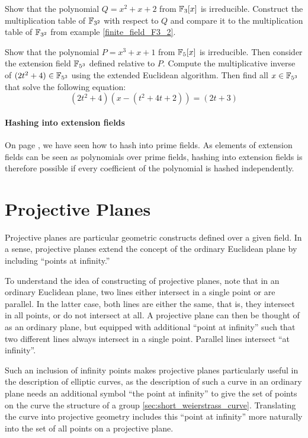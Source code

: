 \begin{exercise} Show that the polynomial $Q=x^2+x+2$ from $\mathbb{F}_3[x]$ is irreducible. Construct the multiplication table of $\mathbb{F}_{3^2}$ with respect to $Q$ and compare it to the multiplication table of $\mathbb{F}_{3^2}$ from example \ref{finite_field_F3_2}.
\end{exercise}

\begin{exercise} Show that the polynomial $P=x^3+x+1$ from $\mathbb{F}_5[x]$ is irreducible. Then consider the extension field $\mathbb{F}_{5^3}$ defined relative to $P$. Compute the multiplicative inverse of $(2t^2+4)\in\mathbb{F}_{5^3}$ using the extended Euclidean algorithm. Then find all $x\in\mathbb{F}_{5^3}$ that solve the following equation:
\begin{equation}
(2t^2+4)(x-(t^2+4t+2))= (2t+3)
\end{equation}
\end{exercise}

\paragraph{Hashing into extension fields} On page \pageref{hashing-prime-fields}, we have seen how to hash into prime fields. As elements of extension fields can be seen as polynomials over prime fields, hashing into extension fields is therefore possible if every coefficient of the polynomial is hashed independently.
\section{Projective Planes}\label{sec:planes}
Projective planes are particular geometric constructs defined over a given field. In a sense, projective planes extend the concept of the ordinary Euclidean plane by including ``points at infinity.''

To understand the idea of constructing of projective planes, note that in
an ordinary Euclidean plane, two lines either intersect in a single point or are parallel. In the latter case, both lines are either the same, that is, they intersect in all points, or do not intersect at all. A projective plane can then be thought of as an ordinary plane, but equipped with additional ``point at infinity'' such that two different lines always intersect in a single point. Parallel lines intersect ``at infinity''.

Such an inclusion of infinity points makes projective planes particularly useful in the description of elliptic curves, as the description of such a curve in an ordinary plane needs an additional symbol ``the point at infinity'' to give the set of points on the curve the structure of a group \ref{sec:short_weierstrass_curve}. Translating the curve into projective geometry includes this ``point at infinity'' more naturally into the set of all points on a projective plane.

